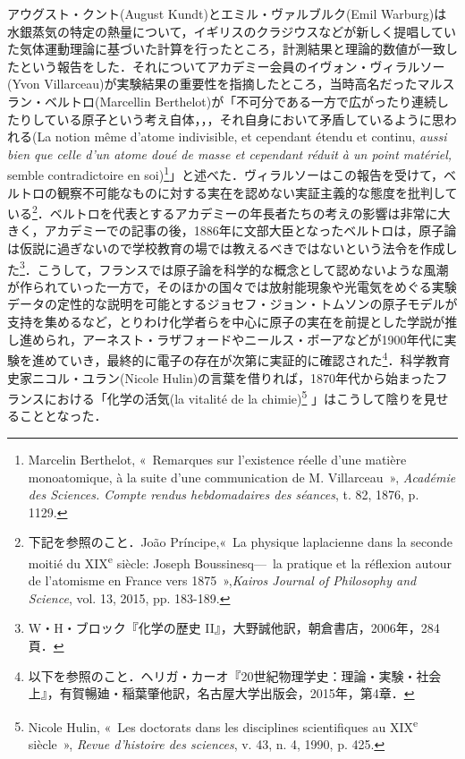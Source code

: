 アウグスト・クント(August Kundt)とエミル・ヴァルブルク(Emil Warburg)は水銀蒸気の特定の熱量について，イギリスのクラジウスなどが新しく提唱していた気体運動理論に基づいた計算を行ったところ，計測結果と理論的数値が一致したという報告をした．それについてアカデミー会員のイヴォン・ヴィラルソー(Yvon Villarceau)が実験結果の重要性を指摘したところ，当時高名だったマルスラン・ベルトロ(Marcellin Berthelot)が「不可分である一方で広がったり連続したりしている原子という考え自体，，，それ自身において矛盾しているように思われる(La notion même d'atome indivisible, et cependant étendu et continu, \emph{aussi bien que celle d'un atome doué de masse et cependant réduit à un point matériel, }semble contradictoire en soi)\footnote{Marcelin Berthelot, «~Remarques sur l'existence réelle d'une matière monoatomique, à la suite d'une communication de M. Villarceau~», \emph{Académie des Sciences. Compte rendus hebdomadaires des séances}, t. 82, 1876, p. 1129. }」と述べた．ヴィラルソーはこの報告を受けて，ベルトロの観察不可能なものに対する実在を認めない実証主義的な態度を批判している\footnote{下記を参照のこと．João Príncipe,«~La physique laplacienne dans la seconde moitié du XIX\textsuperscript{e} siècle: Joseph Boussinesq---~la pratique et la réflexion autour de l’atomisme en France vers 1875~»,\emph{Kairos Journal of Philosophy and Science}, vol. 13, 2015, pp. 183-189.}．ベルトロを代表とするアカデミーの年長者たちの考えの影響は非常に大きく，アカデミーでの記事の後，1886年に文部大臣となったベルトロは，原子論は仮説に過ぎないので学校教育の場では教えるべきではないという法令を作成した\footnote{W・H・ブロック『化学の歴史 II』，大野誠他訳，朝倉書店，2006年，284頁．}．こうして，フランスでは原子論を科学的な概念として認めないような風潮が作られていった一方で，そのほかの国々では放射能現象や光電気をめぐる実験データの定性的な説明を可能とするジョセフ・ジョン・トムソンの原子モデルが支持を集めるなど，とりわけ化学者らを中心に原子の実在を前提とした学説が推し進められ，アーネスト・ラザフォードやニールス・ボーアなどが1900年代に実験を進めていき，最終的に電子の存在が次第に実証的に確認された\footnote{以下を参照のこと．ヘリガ・カーオ『20世紀物理学史：理論・実験・社会 上』，有賀暢廸・稲葉肇他訳，名古屋大学出版会，2015年，第4章．}．科学教育史家ニコル・ユラン(Nicole Hulin)の言葉を借りれば，1870年代から始まったフランスにおける「化学の活気(la vitalité de la chimie)\footnote{Nicole Hulin, «~Les doctorats dans les disciplines scientifiques au XIX\textsuperscript{e} siècle~», \emph{Revue d'histoire des sciences}, v. 43, n. 4, 1990, p. 425.} 」はこうして陰りを見せることとなった．

